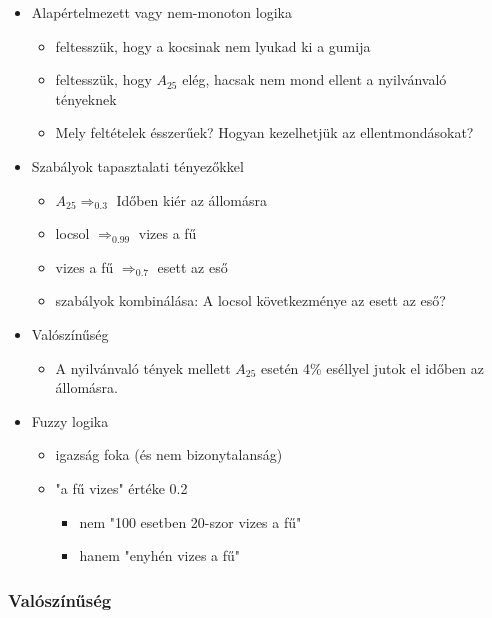 \begin{itemize}
    \item Alapértelmezett vagy nem-monoton logika
        \begin{itemize}
            \item feltesszük, hogy a kocsinak nem lyukad ki a gumija
            \item feltesszük, hogy $A_{25}$ elég, hacsak nem mond ellent a
                nyilvánvaló tényeknek
            \item Mely feltételek ésszerűek? Hogyan kezelhetjük az
                ellentmondásokat?
        \end{itemize}

    \item Szabályok tapasztalati tényezőkkel
        \begin{itemize}
            \item $A_{25} \Rightarrow_{0.3}$ Időben kiér az állomásra
            \item locsol $\Rightarrow_{0.99}$ vizes a fű
            \item vizes a fű $\Rightarrow_{0.7}$ esett az eső
            \item szabályok kombinálása: A locsol következménye az esett az eső?
        \end{itemize}

    \item Valószínűség
        \begin{itemize}
            \item A nyilvánvaló tények mellett $A_{25}$ esetén 4\% eséllyel jutok el
                időben az állomásra.
        \end{itemize}

    \item Fuzzy logika
        \begin{itemize}
            \item igazság foka (és nem bizonytalanság)
            \item "a fű vizes" értéke 0.2
                \begin{itemize}
                    \item nem "100 esetben 20-szor vizes a fű"
                    \item hanem "enyhén vizes a fű"
                \end{itemize}
        \end{itemize}
\end{itemize}

\subsubsection{Valószínűség}

